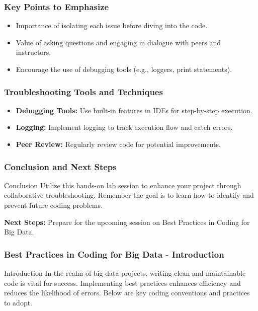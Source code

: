 \documentclass[aspectratio=169]{beamer}
\begin{document}
\begin{frame}[fragile]
    \frametitle{Key Points to Emphasize}
    \begin{itemize}
        \item Importance of isolating each issue before diving into the code.
        \item Value of asking questions and engaging in dialogue with peers and instructors.
        \item Encourage the use of debugging tools (e.g., loggers, print statements).
    \end{itemize}
\end{frame}

\begin{frame}[fragile]
    \frametitle{Troubleshooting Tools and Techniques}
    \begin{itemize}
        \item \textbf{Debugging Tools:} Use built-in features in IDEs for step-by-step execution.
        \item \textbf{Logging:} Implement logging to track execution flow and catch errors.
        \item \textbf{Peer Review:} Regularly review code for potential improvements.
    \end{itemize}
\end{frame}

\begin{frame}[fragile]
    \frametitle{Conclusion and Next Steps}
    \begin{block}{Conclusion}
        Utilize this hands-on lab session to enhance your project through collaborative troubleshooting.
        Remember the goal is to learn how to identify and prevent future coding problems.
    \end{block}
    
    \textbf{Next Steps:} Prepare for the upcoming session on Best Practices in Coding for Big Data.
\end{frame}

\begin{frame}[fragile]
    \frametitle{Best Practices in Coding for Big Data - Introduction}
    \begin{block}{Introduction}
        In the realm of big data projects, writing clean and maintainable code is vital for success. 
        Implementing best practices enhances efficiency and reduces the likelihood of errors. Below are key coding conventions and practices to adopt.
    \end{block}
\end{frame}
\end{document}
